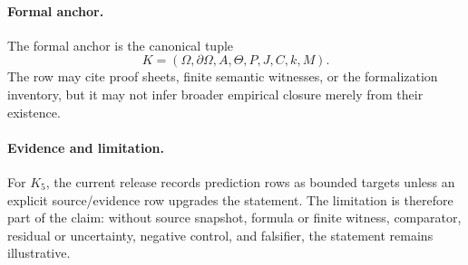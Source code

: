 \paragraph{Formal anchor.}
The formal anchor is the canonical tuple
\[
  K=(\Omega,\partial\Omega,A,\Theta,P,J,C,k,M).
\]
The row may cite proof sheets, finite semantic witnesses, or the formalization
inventory, but it may not infer broader empirical closure merely from their
existence.

\paragraph{Evidence and limitation.}
For \(K_5\), the current release records prediction rows as bounded
targets unless an explicit source/evidence row upgrades the statement. The
limitation is therefore part of the claim: without source snapshot, formula or
finite witness, comparator, residual or uncertainty, negative control, and
falsifier, the statement remains illustrative.
